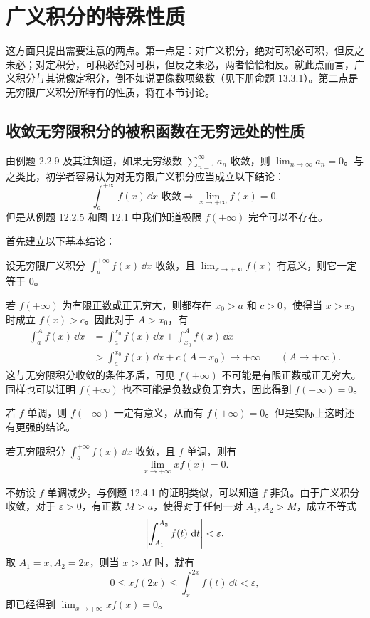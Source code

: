 \section{广义积分的特殊性质}

这方面只提出需要注意的两点。第一点是：对广义积分，绝对可积必可积，但反之未必；对定积分，可积必绝对可积，但反之未必，两者恰恰相反。就此点而言，广义积分与其说像定积分，倒不如说更像数项级数（见下册命题 13.3.1）。第二点是无穷限广义积分所特有的性质，将在本节讨论。

\subsection{收敛无穷限积分的被积函数在无穷远处的性质}

由例题 2.2.9 及其注知道，如果无穷级数 $\sum_{n=1}^{\infty}a_n$ 收敛，则 $\lim_{n\to\infty}a_n=0$。与之类比，初学者容易认为对无穷限广义积分应当成立以下结论：
\[
  \int_a^{+\infty}f(x)\,\dd x\text{ 收敛}\Longrightarrow\lim_{x\to+\infty}f(x)=0.
\]
但是从例题 12.2.5 和图 12.1 中我们知道极限 $f(+\infty)$ 完全可以不存在。

首先建立以下基本结论：

\begin{xexample}[12.4.1]
设无穷限广义积分 $\int_a^{+\infty}f(x)\,\dd x$ 收敛，且 $\lim_{x\to+\infty}f(x)$ 有意义，则它一定等于 0。
\end{xexample}
\begin{xproof}
若 $f(+\infty)$ 为有限正数或正无穷大，则都存在 $x_0>a$ 和 $c>0$，使得当 $x>x_0$ 时成立 $f(x)>c$。因此对于 $A>x_0$，有
\begin{align*}
  \int_a^A f(x)\,\dd x
  &=\int_a^{x_0}f(x)\,\dd x+\int_{x_0}^A f(x)\,\dd x\\
  &>\int_a^{x_0}f(x)\,\dd x+c(A-x_0)\to+\infty\qquad(A\to+\infty).
\end{align*}
这与无穷限积分收敛的条件矛盾，可见 $f(+\infty)$ 不可能是有限正数或正无穷大。同样也可以证明 $f(+\infty)$ 也不可能是负数或负无穷大，因此得到 $f(+\infty)=0$。
\end{xproof}

若 $f$ 单调，则 $f(+\infty)$ 一定有意义，从而有 $f(+\infty)=0$。但是实际上这时还有更强的结论。

\begin{xexample}[12.4.2]
若无穷限积分 $\int_a^{+\infty}f(x)\,\dd x$ 收敛，且 $f$ 单调，则有
\[
  \lim_{x\to+\infty}xf(x)=0.
\]
\end{xexample}
\begin{xproof}
不妨设 $f$ 单调减少。与例题 12.4.1 的证明类似，可以知道 $f$ 非负。由于广义积分收敛，对于 $\varepsilon>0$，有正数 $M>a$，使得对于任何一对 $A_1,A_2>M$，成立不等式
\[
  \abs*{\int_{A_1}^{A_2}f(t)\,\dd t}<\varepsilon.
\]
取 $A_1=x,A_2=2x$，则当 $x>M$ 时，就有
\[
  0\leq xf(2x)\leq\int_x^{2x}f(t)\,\dd t<\varepsilon,
\]
即已经得到 $\lim_{x\to+\infty}xf(x)=0$。
\end{xproof}

